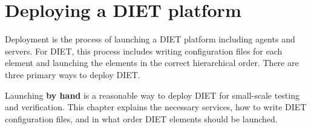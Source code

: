 
\chapter{Deploying a DIET platform}
\label{ch:deploying}

Deployment is the process of launching a DIET platform including agents
and servers.  For DIET, this process includes writing configuration
files for each element and launching the elements in the correct
hierarchical order. There are three primary ways to deploy DIET.

Launching \textbf{by hand} is a reasonable way to deploy DIET for
small-scale testing and verification. This chapter explains the 
necessary services, how to write DIET configuration files, and in
what order DIET elements should be launched.

